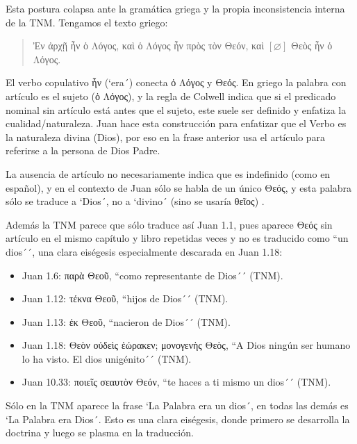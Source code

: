 \documentclass[12pt]{report}
\begin{document}
	\begin{subbloque}[Dúplica]
		Esta postura colapsa ante la gramática griega y la propia inconsistencia interna de la TNM. Tengamos el texto griego:
		\begin{quote}
			\textgreek{Ἐν ἀρχῇ ἦν ὁ Λόγος, καὶ ὁ Λόγος ἦν πρὸς τὸν Θεόν, καὶ} $[\varnothing]$ \textgreek{Θεὸς ἦν ὁ Λόγος.}
		\end{quote}
		El verbo copulativo \textgreek{ἦν} (`era´) conecta \textgreek{ὁ Λόγος} y \textgreek{Θεός}. En griego la palabra con artículo es el sujeto (\textgreek{ὁ Λόγος}), y la regla de Colwell indica que si el predicado nominal sin artículo está antes que el sujeto, este suele ser definido y enfatiza la cualidad/naturaleza. Juan hace esta construcción para enfatizar que el Verbo es la naturaleza divina (Dios), por eso en la frase anterior usa el artículo para referirse a la persona de Dios Padre.
		
		La ausencia de artículo no necesariamente indica que es indefinido (como en español), y en el contexto de Juan sólo se habla de un único \textgreek{Θεός}, y esta palabra sólo se traduce a `Dios´, no a `divino´ (sino se usaría \textgreek{θεῖος}) .
		
		Además la TNM parece que sólo traduce así Juan 1.1, pues aparece \textgreek{Θεός} sin artículo en el mismo capítulo y libro repetidas veces y no es traducido como ``un dios´´, una clara eiségesis especialmente descarada en Juan 1.18:
		\begin{itemize}
			\item Juan 1.6: \textgreek{παρὰ Θεοῦ}, ``como representante de Dios´´ (TNM).
			\item Juan 1.12: \textgreek{τέκνα Θεοῦ}, ``hijos de Dios´´ (TNM).
			\item Juan 1.13: \textgreek{ἐκ Θεοῦ}, ``nacieron de Dios´´ (TNM).
			\item Juan 1.18: \textgreek{Θεὸν οὐδεὶς ἑώρακεν; μονογενὴς Θεὸς}, ``A Dios ningún ser humano lo ha visto. El dios unigénito´´ (TNM).
			\item Juan 10.33: \textgreek{ποιεῖς σεαυτὸν Θεόν}, ``te haces a ti mismo un dios´´ (TNM).
		\end{itemize}
	\end{subbloque}
	
	\begin{minibloque}
		Sólo en la TNM aparece la frase `La Palabra era un dios´, en todas las demás es `La Palabra era Dios´. Esto es una clara eiségesis, donde primero se desarrolla la doctrina y luego se plasma en la traducción.
	\end{minibloque}
	
\end{document}
